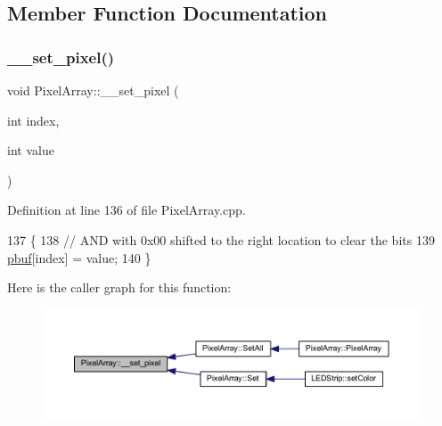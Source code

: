 \subsection{Member Function Documentation}
\mbox{\label{class_pixel_array_a4b1a6582bc3bab1f67aebd1f97a5595d}} 
\subsubsection{\texorpdfstring{\+\_\+\+\_\+set\+\_\+pixel()}{\_\_set\_pixel()}}
{\footnotesize\ttfamily void Pixel\+Array\+::\+\_\+\+\_\+set\+\_\+pixel (\begin{DoxyParamCaption}\item[{int}]{index,  }\item[{int}]{value }\end{DoxyParamCaption})\hspace{0.3cm}{\ttfamily [private]}}



Definition at line 136 of file Pixel\+Array.\+cpp.


\begin{DoxyCode}
137 \{
138     \textcolor{comment}{// AND with 0x00 shifted to the right location to clear the bits}
139     \hyperlink{class_pixel_array_ab0109a336e69a9942b2723e43ee715d7}{pbuf}[index] = value;
140 \}
\end{DoxyCode}
Here is the caller graph for this function\+:\nopagebreak
\begin{figure}[H]
\begin{center}
\leavevmode
\includegraphics[width=350pt]{class_pixel_array_a4b1a6582bc3bab1f67aebd1f97a5595d_icgraph}
\end{center}
\end{figure}
\mbox{\label{class_pixel_array_a42c6681bf771332826ecc9ad2a8cea02}} 
